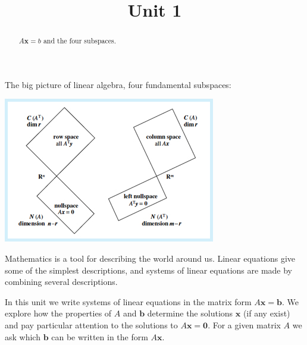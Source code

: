 \documentclass{ximera}
\title{Unit 1}
\begin{document}
\begin{abstract}
$A\mathbf{x} = b$ and the four subspaces.
\end{abstract}
\maketitle

The big picture of linear algebra, four fundamental subspaces:
\begin{image}
\includegraphics{Unit_1_WIDE.jpg}
\end{image}


Mathematics is a tool for describing the world around us. Linear
equations give some of the simplest descriptions, and systems of
linear equations are made by combining several descriptions.


In this unit we write systems of linear equations in the matrix form
$A\mathbf{x} = \mathbf{b}$. We explore how the properties of $A$ and
$\mathbf{b}$ determine the solutions $\mathbf{x}$ (if any exist) and
pay particular attention to the solutions to $A\mathbf{x} =
\mathbf{0}$. For a given matrix $A$ we ask which $\mathbf{b}$ can be
written in the form $A\mathbf{x}$.
\end{document}
